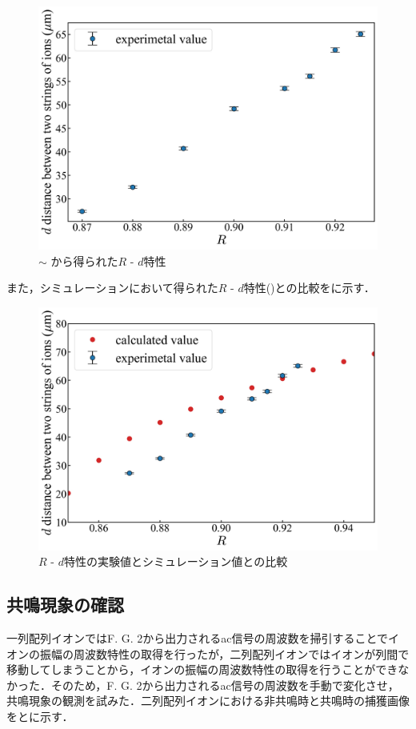 \begin{figure}[h]
	\begin{center}
		\includegraphics[width = 0.6\linewidth]{./results/figure/2D_meas_R_d.jpg}
		\caption{ $\sim$ から得られた$R$ - $d$特性}
		\label{fig:R_d}
	\end{center}
\end{figure}

また，シミュレーションにおいて得られた$R$ - $d$特性()との比較をに示す．

\begin{figure}[h]
	\begin{center}
		\includegraphics[width = 0.6\linewidth]{./results/figure/2D_Calc_vs_Meas_R-d.jpg}
		\caption{$R$ - $d$特性の実験値とシミュレーション値との比較}
		\label{fig:R-d_Calc_vs_Meas}
	\end{center}
\end{figure}
%
\clearpage
%
\subsection{共鳴現象の確認}\label{2D_res}
一列配列イオンではF. G. 2から出力されるac信号の周波数を掃引することでイオンの振幅の周波数特性の取得を行ったが，二列配列イオンではイオンが列間で移動してしまうことから，イオンの振幅の周波数特性の取得を行うことができなかった．そのため，F. G. 2から出力されるac信号の周波数を手動で変化させ，共鳴現象の観測を試みた．二列配列イオンにおける非共鳴時と共鳴時の捕獲画像をとに示す．

